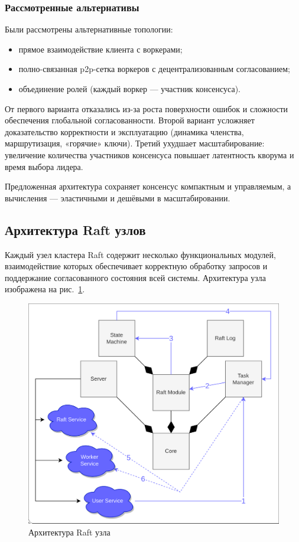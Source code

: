 \subsubsection{Рассмотренные альтернативы}

Были рассмотрены альтернативные топологии:

\begin{itemize}
\item прямое взаимодействие клиента с воркерами;
\item полно-связанная p2p-сетка воркеров с децентрализованным согласованием;
\item объединение ролей (каждый воркер — участник консенсуса).
\end{itemize}

От первого варианта отказались из-за роста поверхности ошибок и сложности
обеспечения глобальной согласованности. Второй вариант усложняет доказательство
корректности и эксплуатацию (динамика членства, маршрутизация, «горячие»
ключи). Третий ухудшает масштабирование: увеличение количества участников
консенсуса повышает латентность кворума и время выбора лидера.

Предложенная архитектура сохраняет консенсус компактным и управляемым, а
вычисления — эластичными и дешёвыми в масштабировании.

\subsection{Архитектура Raft узлов}

Каждый узел кластера Raft содержит несколько функциональных модулей,
взаимодействие которых обеспечивает корректную обработку запросов и поддержание
согласованного состояния всей системы. Архитектура узла изображена на
рис.~\ref{fig:arch-overview}.

\begin{figure}
  \centering
  \includegraphics[scale=0.35]{inc/raft-arch.png}
  \caption{Архитектура Raft узла}
  \label{fig:arch-overview}
\end{figure}

